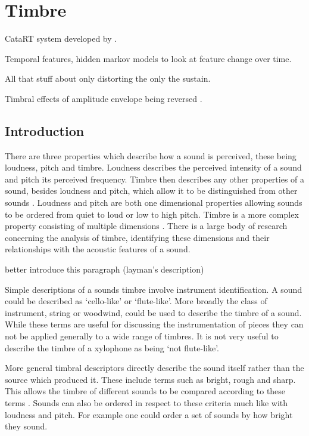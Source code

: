 
\chapter{Timbre}
\label{chap:Timbre}
\note
{
	CataRT system developed by \citet{schwarz2007corpus}.

	Temporal features, hidden markov models to look at feature change over time. 

	All that stuff about only distorting the only the sustain.

	Timbral effects of amplitude envelope being reversed \citep{patterson1994the}.

}

\section{Introduction}
\label{sec:Timbre-Introduction}
	There are three properties which describe how a sound is perceived, these being loudness, pitch and timbre.
	Loudness describes the perceived intensity of a sound and pitch its perceived frequency. Timbre then describes any
	other properties of a sound, besides loudness and pitch, which allow it to be distinguished from other sounds
	\citep{mathews1999introduction}. Loudness and pitch are both one dimensional properties allowing sounds to be
	ordered from quiet to loud or low to high pitch. Timbre is a more complex property consisting of multiple
	dimensions \citep{rossing2002the}. There is a large body of research concerning the analysis of timbre, identifying
	these dimensions and their relationships with the acoustic features of a sound.

	\note
	{
		better introduce this paragraph (layman's description)
	}

	Simple descriptions of a sounds timbre involve instrument identification. A sound could be described as
	`cello-like' or `flute-like'. More broadly the class of instrument, string or woodwind, could be used to describe
	the timbre of a sound. While these terms are useful for discussing the instrumentation of pieces they can not be
	applied generally to a wide range of timbres. It is not very useful to describe the timbre of a xylophone as being
	`not flute-like'.

	More general timbral descriptors directly describe the sound itself rather than the source which produced it. These
	include terms such as bright, rough and sharp. This allows the timbre of different sounds to be compared according
	to these terms \citep{howard2009acoustics}. Sounds can also be ordered in respect to these criteria much like with
	loudness and pitch. For example one could order a set of sounds by how bright they sound.

